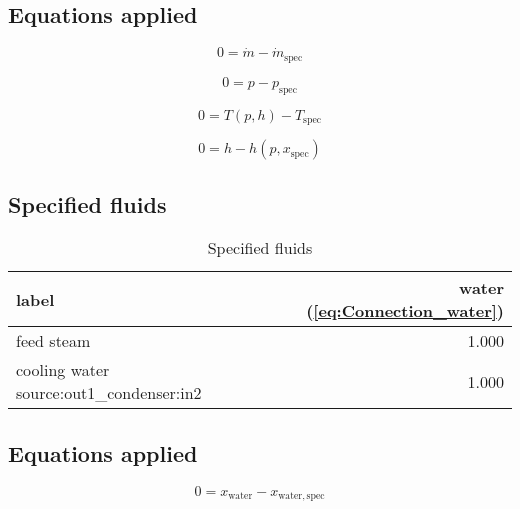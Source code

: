 \subsection{Equations applied}

\begin{equation}
\label{eq:Connection_mass flow}
0 = \dot{m} - \dot{m}_\mathrm{spec}
\end{equation}

\begin{equation}
\label{eq:Connection_pressure}
0 = p - p_\mathrm{spec}
\end{equation}

\begin{equation}
\label{eq:Connection_temperature}
0 = T \left(p, h \right) - T_\mathrm{spec}
\end{equation}

\begin{equation}
\label{eq:Connection_vapor mass fraction}
0 = h - h\left(p, x_\mathrm{spec}\right)
\end{equation}

\subsection{Specified fluids}

\begin{table}[H]\begin{center}
\begin{tabular}{lr}
\toprule
                                    label &  water (\ref{eq:Connection_water}) \\
\midrule
                               feed steam &                              1.000 \\
 cooling water source:out1\_condenser:in2 &                              1.000 \\
\bottomrule
\end{tabular}
\caption{Specified fluids}
\end{center}\end{table}

\subsection{Equations applied}

\begin{equation}
\label{eq:Connection_water}
0 = x_\mathrm{water} - x_\mathrm{water,spec}
\end{equation}

